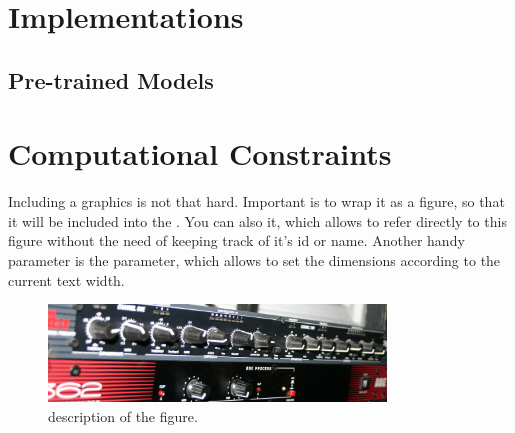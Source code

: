\newpage
\section{Implementations}
\subsection{Pre-trained Models}

\section{Computational Constraints}

Including a graphics is not that hard. Important is to wrap it as a figure, so that it will be included into the . You can also  it, which allows to refer directly to this figure without the need of keeping track of it's id or name. Another handy parameter is the  parameter, which allows to set the dimensions according to the current text width.

\begin{figure}[H]
\begin{center}
\includegraphics[width=0.8\textwidth]{media/amp.jpg}
\end{center}
\caption[TBC]{description of the figure. }
\end{figure}







